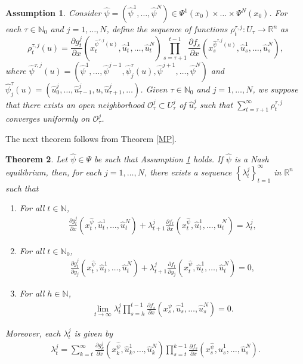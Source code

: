 \documentclass[3p]{elsarticle}
\newcommand{\rzn}{\mathbb R^{n}}
\newcommand{\nat}{\mathbb N_0}
\newcommand{\natu}{\mathbb N}
\newtheorem{thm}{Theorem}
\newtheorem{assu}[thm]{Assumption}
\begin{document}
	
	\begin{assu}\label{AMPDG}
		Consider $\hat{\psi}=(\hat\psi^1,\dots,\hat\psi^N)\in\Psi^1(x_0)\times\dots\times\Psi^N(x_0)$. For each  $\tau\in\nat$ and $j=1,\dots, N$, define the sequence of functions $\rho^{\tau,j}_t: U_\tau\to\rzn$ as $$\rho^{\tau,j}_t(u)=\frac{\partial g_t^j}{\partial x}( x_t^{{\hat\psi^{\tau,j}(u)}}, \hat u_t^1,\dots, \hat u_t^N)\prod_{s=\tau+1}^{t-1}\frac{\partial f_s}{\partial x}(x_s^{{\hat\psi^{\tau,j}(u)}}, \hat u_s^1,\dots, \hat u_s^N),$$ 
		where $\hat\psi^{\tau,j}(u)=(\hat\psi^1,\dots,\hat \psi^{j-1},\hat\psi_j^\tau(u),\hat\psi^{j+1},\dots,\hat\psi^N)$ and  $\hat\psi_j^\tau(u)=(\hat u_0^j,\dots,\hat u_{\tau-1}^j,u,\hat u_{\tau+1}^j,\dots)$. 
		Given $\tau\in\nat$ and $j=1,\dots, N$, we suppose that there exists an open neighborhood $\mathcal O_\tau^j\subset U_\tau^j$ of $\hat u_\tau^j$ such that $\sum_{t=\tau+1}^{\infty}\rho^{\tau,j}_{t}$ converges uniformly on $\mathcal O_\tau^j$. 
		
	\end{assu}
	
	The next theorem follows from Theorem \ref{MP}.
	
	\begin{thm}\label{NEMP}
		Let $\hat \psi\in\Psi$ be such that Assumption \ref{AMPDG} holds. If $\hat\psi$ is a Nash equilibrium, then, for each $j=1,\dots, N$, there exists a sequence $\left\lbrace \lambda^j_t\right\rbrace_{t=1}^\infty$ in $\rzn$ such that
		\begin{enumerate}
			\item[(a)] For all $t\in\natu$,
			\begin{align}\label{MPXDG}
			\frac{\partial g^j_t}{\partial x}(x_t^{\hat\psi},\hat u_t^1,\dots,\hat u_t^N)+\lambda_{t+1}^j\frac{\partial f_t}{\partial x}(x_t^{\hat\psi},\hat u_t^1,\dots,\hat u_t^N)=\lambda^j_t,
			\end{align}
			\item[(b)] For all $t\in\nat$,
			\begin{align}\label{MPYDG}
			\frac{\partial g_t^j}{\partial y_j}(x_t^{\hat\psi},\hat u_t^1,\dots,\hat u_t^N)+\lambda^j_{t+1}\frac{\partial f_t}{\partial y_j}(x_t^{\hat\psi},\hat u_t^1,\dots,\hat u_t^N)=0,
			\end{align}
			\item[(c)] For all $h\in\natu$,
			\begin{align}\label{TCDG}
			\lim_{t\to\infty}\lambda^j_t \prod_{s=h}^{t-1}\frac{\partial f_s}{\partial x}(x_s^{\hat\psi},\hat u_s^1,\dots,\hat u_s^N)=0.
			\end{align}  
		\end{enumerate}
		Moreover, each $\lambda_t^j$ is given by 
		\begin{align}\label{DGmultipliers}
		\lambda^j_t=\sum_{k=t}^\infty\frac{\partial g^j_k}{\partial x}(x_k^{\hat\psi},\hat u_k^1,\dots,\hat u_k^N)\prod_{s=t}^{k-1}\frac{\partial f_s}{\partial x}(x_s^{\hat\psi},\hat u_s^1,\dots,\hat u_s^N).
		\end{align}
	\end{thm}
	
\end{document}
